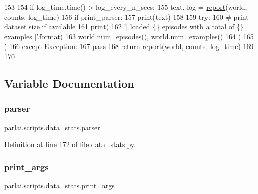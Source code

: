 \begin{DoxyCode}
153 
154         \textcolor{keywordflow}{if} log\_time.time() > log\_every\_n\_secs:
155             text, log = \hyperlink{namespaceparlai_1_1scripts_1_1data__stats_a8cc2308cc735ce6cf029d4c02fea5a21}{report}(world, counts, log\_time)
156             \textcolor{keywordflow}{if} print\_parser:
157                 print(text)
158 
159     \textcolor{keywordflow}{try}:
160         \textcolor{comment}{# print dataset size if available}
161         print(
162             \textcolor{stringliteral}{'[ loaded \{\} episodes with a total of \{\} examples ]'}.\hyperlink{namespaceparlai_1_1chat__service_1_1services_1_1messenger_1_1shared__utils_a32e2e2022b824fbaf80c747160b52a76}{format}(
163                 world.num\_episodes(), world.num\_examples()
164             )
165         )
166     \textcolor{keywordflow}{except} Exception:
167         \textcolor{keywordflow}{pass}
168     \textcolor{keywordflow}{return} \hyperlink{namespaceparlai_1_1scripts_1_1data__stats_a8cc2308cc735ce6cf029d4c02fea5a21}{report}(world, counts, log\_time)
169 
170 
\end{DoxyCode}


\subsection{Variable Documentation}
\mbox{\label{namespaceparlai_1_1scripts_1_1data__stats_aee1c7e7ad83716e519beffc34ff7c8cd}} 
\subsubsection{\texorpdfstring{parser}{parser}}
{\footnotesize\ttfamily parlai.\+scripts.\+data\+\_\+stats.\+parser}



Definition at line 172 of file data\+\_\+stats.\+py.

\mbox{\label{namespaceparlai_1_1scripts_1_1data__stats_a56b1df909ab791a73bd6c2d5d4776531}} 
\subsubsection{\texorpdfstring{print\+\_\+args}{print\_args}}
{\footnotesize\ttfamily parlai.\+scripts.\+data\+\_\+stats.\+print\+\_\+args}



